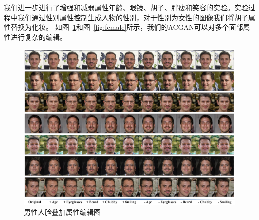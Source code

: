 我们进一步进行了增强和减弱属性年龄、眼镜、胡子、胖瘦和笑容的实验。实验过程中我们通过性别属性控制生成人物的性别，对于性别为女性的图像我们将胡子属性替换为化妆。 如图~\ref{fig:male}和图~\ref{fig:female}所示，我们的ACGAN可以对多个面部属性进行复杂的编辑。

\begin{figure}[!t]
     \begin{center}
          \includegraphics[width=1\linewidth]{figures/ACGAN//male.pdf}
     \end{center}
     \caption{男性人脸叠加属性编辑图}
     \label{fig:male}
\end{figure}

